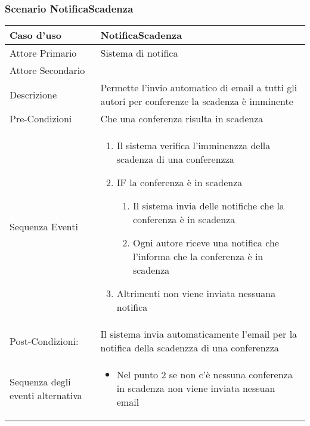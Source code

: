 \subsubsection{Scenario NotificaScadenza}
\begin{tabular}{|p{3cm}|p{7cm}|}
\hline 
\rowcolor{Orchid}
Caso d'uso & NotificaScadenza \\
\hline
Attore Primario & Sistema di notifica\\
\hline
Attore Secondario & \\
\hline
Descrizione & Permette l'invio automatico di email a tutti gli autori per conferenze la scadenza è imminente\\
\hline
Pre-Condizioni& Che una conferenza risulta in scadenza\\
\hline
  Sequenza Eventi&
                   \begin{enumerate}
                   \item Il sistema verifica l'imminenzza della scadenza di una conferenzza
                   \item IF la conferenza è in scadenza
                    \begin{enumerate}
                    \item Il sistema invia delle notifiche che la conferenza è in scadenza
                    \item Ogni autore riceve una notifica che l'informa che la conferenza è in scadenza
                    \end{enumerate}
                   \item Altrimenti non viene inviata nessuana notifica
                   \end{enumerate}\\
\hline
Post-Condizioni: & Il sistema invia automaticamente l'email per la notifica della scadenzza di una conferenzza\\
\hline
Sequenza degli eventi alternativa & \begin{itemize}
  \item Nel punto 2 se non c'è nessuna conferenza in scadenza non viene inviata nessuan email
\end{itemize} \\
\hline
\end{tabular}

